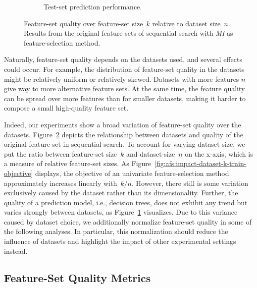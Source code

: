 \documentclass{article}
\theoremstyle{definition}
\begin{document}
\begin{figure}[htb]
\begin{subfigure}[t]{0.48\textwidth}
		\caption{Test-set prediction performance.}
		\label{fig:afs:impact-dataset-k-decision-tree-test-mcc}
	\end{subfigure}
	\caption{
		Feature-set quality over feature-set size~$k$ relative to dataset size~$n$.
		Results from the original feature sets of sequential search with \emph{MI} as feature-selection method.
	}
	\label{fig:afs:impact-dataset-k-quality}
\end{figure}

Naturally, feature-set quality depends on the datasets used, and several effects could occur.
For example, the distribution of feature-set quality in the datasets might be relatively uniform or relatively skewed.
Datasets with more features $n$ give way to more alternative feature sets.
At the same time, the feature quality can be spread over more features than for smaller datasets, making it harder to compose a small high-quality feature set.

Indeed, our experiments show a broad variation of feature-set quality over the datasets.
Figure~\ref{fig:afs:impact-dataset-k-quality} depicts the relationship between datasets and quality of the original feature set in sequential search.
To account for varying dataset size, we put the ratio between feature-set size~$k$ and dataset-size~$n$ on the x-axis, which is a measure of relative feature-set sizes.
As Figure~\ref{fig:afs:impact-dataset-k-train-objective} displays, the objective of an univariate feature-selection method approximately increases linearly with~$k/n$.
However, there still is some variation exclusively caused by the dataset rather than its dimensionality.
Further, the quality of a prediction model, i.e., decision trees, does not exhibit any trend but varies strongly between datasets, as Figure~\ref{fig:afs:impact-dataset-k-decision-tree-test-mcc} visualizes.
Due to this variance caused by dataset choice, we additionally normalize feature-set quality in some of the following analyses.
In particular, this normalization should reduce the influence of datasets and highlight the impact of other experimental settings instead.

\subsection{Feature-Set Quality Metrics}
\label{sec:afs:evaluation:metrics}
\end{document}
